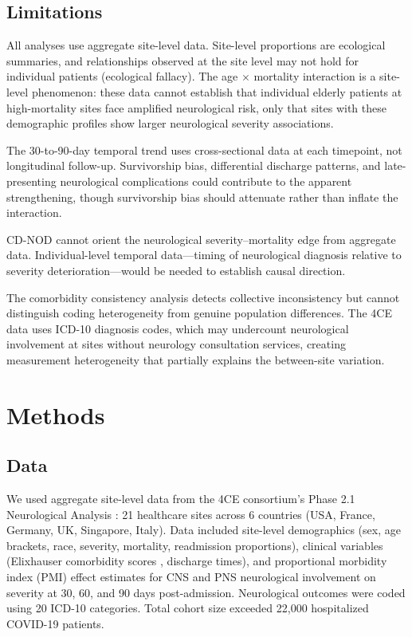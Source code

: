 \documentclass{article}
\begin{document}
\subsection{Limitations}

All analyses use aggregate site-level data.
Site-level proportions are ecological summaries, and relationships observed at the site level may not hold for individual patients (ecological fallacy).
The age $\times$ mortality interaction is a site-level phenomenon: these data cannot establish that individual elderly patients at high-mortality sites face amplified neurological risk, only that sites with these demographic profiles show larger neurological severity associations.

The 30-to-90-day temporal trend uses cross-sectional data at each timepoint, not longitudinal follow-up.
Survivorship bias, differential discharge patterns, and late-presenting neurological complications could contribute to the apparent strengthening, though survivorship bias should attenuate rather than inflate the interaction.

CD-NOD cannot orient the neurological severity--mortality edge from aggregate data.
Individual-level temporal data---timing of neurological diagnosis relative to severity deterioration---would be needed to establish causal direction.

The comorbidity consistency analysis detects collective inconsistency but cannot distinguish coding heterogeneity from genuine population differences.
The 4CE data uses ICD-10 diagnosis codes, which may undercount neurological involvement at sites without neurology consultation services, creating measurement heterogeneity that partially explains the between-site variation.


\section{Methods}

\subsection{Data}

We used aggregate site-level data from the 4CE consortium's Phase 2.1 Neurological Analysis \cite{four_ce_neuro2021, chou20224ce}: 21 healthcare sites across 6 countries (USA, France, Germany, UK, Singapore, Italy).
Data included site-level demographics (sex, age brackets, race, severity, mortality, readmission proportions), clinical variables (Elixhauser comorbidity scores \cite{elixhauser1998}, discharge times), and proportional morbidity index (PMI) effect estimates for CNS and PNS neurological involvement on severity at 30, 60, and 90 days post-admission.
Neurological outcomes were coded using 20 ICD-10 categories.
Total cohort size exceeded 22,000 hospitalized COVID-19 patients.
\end{document}
